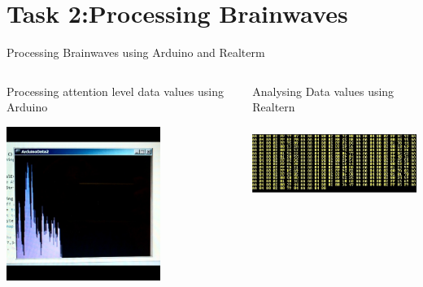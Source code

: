 \documentclass[10pt, a4paper]{beamer}
\begin{document}
\section{Task 2:Processing Brainwaves}
\begin{frame}{Processing Brainwaves using Arduino and Realterm}	
		\begin{columns}[T]
			\begin{column}{.45\textwidth}
				\begin{block}{Processing attention level data values using Arduino}
					\graphicspath{ {images/} }
					\includegraphics[width=5cm, height=5cm]{Arduino}
					\centering
				\end{block}
			\end{column}
			\begin{column}{.55\textwidth}
				\begin{block}{Analysing Data values using Realtern}
					\graphicspath{ {images/} }
					\includegraphics[width=5.5cm, height=2.4cm]{data_values1}
					\centering
				\end{block}
			\end{column}
		\end{columns}	
\end{frame}
\end{document}
